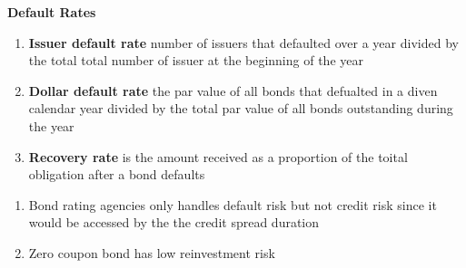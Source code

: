 \documentclass[11pt,fleqn]{report} %
\numberwithin{equation}{section} %
\numberwithin{figure}{section} %
\numberwithin{table}{section} %
\begin{document}
\begin{definition}\textbf{Default Rates}
    \begin{enumerate}
        \item \textbf{Issuer default rate} number of issuers that defaulted over a year divided by the total
        total number of issuer at the beginning of the year
        \item \textbf{Dollar default rate} the par value of all bonds that defualted in a diven calendar year
        divided by the total par value of all bonds outstanding during the year
        \item \textbf{Recovery rate} is the amount received as a proportion of the toital obligation
        after a bond defaults
    \end{enumerate}
\end{definition}
\begin{remark}
    \begin{enumerate}
        \item Bond rating agencies only handles default risk but not credit risk since it would be accessed by the
        the credit spread duration
        \item Zero coupon bond has low reinvestment risk
    \end{enumerate}
\end{remark}
\end{document}
